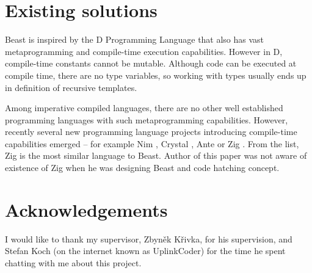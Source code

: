 \documentclass{ExcelAtFIT}
\begin{document}
\begin{comment}
There is still a big difference between \ctime and \nonctime variables. First, this "runtime mirroring" is not necessary at all in a lot of practical use cases. Second, the mirroring can be a lot faster than runtime execution -- mirroring does not require the evaluation to be done at runtime, a simple memory overwrite with newer values (and only where the \ctime data changed since the last mirroring) is enough.

The compiler has a virtual memory address space that is used during interpretation. This address space is different from the address space of an output binary file. Since it is possible to have references (and pointers) during compile time, it is necessary to implement address translation between these two address spaces. Because of that, the compiler has to know what data in the virtual memory is a reference, because values of \ctime references are changed during the linking process. This is realized by dedicated interpreter instructions called within reference (pointer) constructor/destructors that mark/unmark the memory as a reference.

This text briefly describes all key components necessary to implement the code hatching concept. More in-depth analysis can be found in bachelor thesis downloadable from the Git repository.
\end{comment} 

\section{Existing solutions}
Beast is inspired by the D Programming Language \cite{DLang} that also has vast metaprogramming and compile-time execution capabilities. However in D, compile-time constants cannot be mutable. Although code can be executed at compile time, there are no type variables, so working with types usually ends up in definition of recursive templates.

Among imperative compiled languages, there are no other well established programming languages with such metaprogramming capabilities. However, recently several new programming language projects introducing compile-time capabilities emerged -- for example Nim \cite{NimLang}, Crystal \cite{CrystalLang}, Ante \cite{AnteLang} or Zig \cite{ZigLang}. From the list, Zig is the most similar language to Beast. Author of this paper was not aware of existence of Zig when he was designing Beast and code hatching concept.

\section*{Acknowledgements}
I would like to thank my supervisor, Zbyněk Křivka, for his supervision, and Stefan Koch (on the internet known as UplinkCoder) for the time he spent chatting with me about this project.
\end{document}
